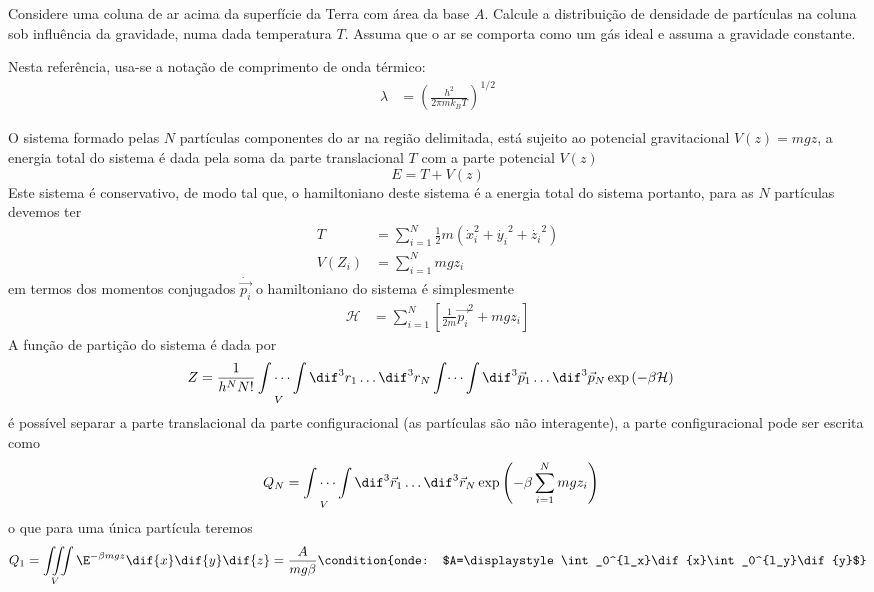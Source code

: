 \begin{prob}
  Considere uma coluna de ar acima da superfície da Terra com área da base $A$. Calcule a distribuição de densidade de partículas na coluna sob influência da gravidade, numa dada temperatura $T$. Assuma que o ar se comporta como um gás ideal e assuma a gravidade constante.

  \noindent Nesta referência, usa-se a notação de comprimento de onda térmico:
  \begin{align}
    \lambda&=\left(\frac{h^2}{2\pi mk_BT}\right)^{1/2}
  \end{align}
  \begin{sol}
    O sistema formado pelas $N$ partículas componentes do ar na região delimitada, está sujeito ao potencial gravitacional $V(z)=mgz$, a energia total do sistema é dada pela soma da parte translacional $T$ com a parte potencial $V(z)$
    \begin{dmath*}
      E=T+V(z)
    \end{dmath*}
    Este sistema é conservativo, de modo tal que, o hamiltoniano deste sistema é a energia total do sistema portanto, para as $N$ partículas devemos ter
    \begin{align}
      T&=\sum_{i=1}^N\frac{1}{2}m(\dot{x}_i^2+\dot{y_i}^2+\dot{z_i}^2)\\
      V(Z_i)&=\sum_{i=1}^Nmgz_i
    \end{align}
    em termos dos momentos conjugados $\dot{\vec{p_i}}$ o hamiltoniano do sistema é simplesmente
    \begin{align}
      \mathcal{H}&=\sum_{i=1}^N\left[\frac{1}{2m}\vec{p_i}^2+mgz_i\right]
    \end{align}
    A função de partição do sistema é dada por
    \begin{align}
      Z&=\frac{1}{h^NN!}\idotsint\limits_{V}\dif^3{r_1}\dots\dif^3{r_N}\int \dots \int \dif^3{\vec{p}_1}\dots\dif^3{\vec{p}_N}\exp\left(-\beta\mathcal{H}\right)
    \end{align}
    é possível separar a parte translacional da parte configuracional (as partículas são não interagente), a parte configuracional pode ser escrita como
    \begin{align}
      Q_N&=\idotsint\limits_{V}\dif^3{\vec{r}_1}\dots\dif^3{\vec{r}_N}\exp\left(-\beta\sum_{i=1}^Nmgz_i\right)
    \end{align}
    o que para uma única partícula teremos
    \begin{dmath*}
      Q_1=\iiint\limits_{V}\E^{-\beta mgz}\dif{x}\dif{y}\dif{z}=\frac{A}{mg\beta}\condition{onde: $A=\displaystyle\int_0^{l_x}\dif{x}\int_0^{l_y}\dif{y}$}

\end{dmath*}
\end{sol}
\end{prob}
